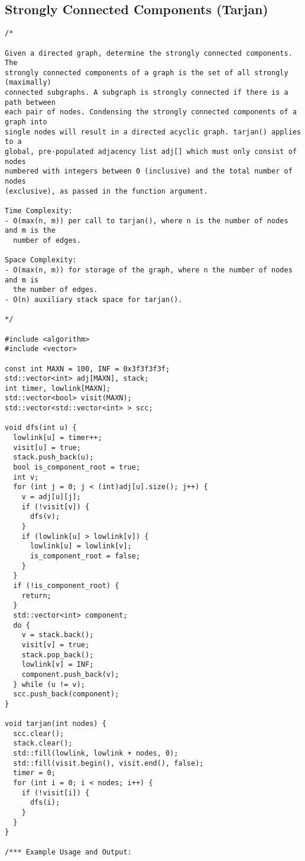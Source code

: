 \subsection{Strongly Connected Components (Tarjan)}
\begin{lstlisting}
/*

Given a directed graph, determine the strongly connected components. The
strongly connected components of a graph is the set of all strongly (maximally)
connected subgraphs. A subgraph is strongly connected if there is a path between
each pair of nodes. Condensing the strongly connected components of a graph into
single nodes will result in a directed acyclic graph. tarjan() applies to a
global, pre-populated adjacency list adj[] which must only consist of nodes
numbered with integers between 0 (inclusive) and the total number of nodes
(exclusive), as passed in the function argument.

Time Complexity:
- O(max(n, m)) per call to tarjan(), where n is the number of nodes and m is the
  number of edges.

Space Complexity:
- O(max(n, m)) for storage of the graph, where n the number of nodes and m is
  the number of edges.
- O(n) auxiliary stack space for tarjan().

*/

#include <algorithm>
#include <vector>

const int MAXN = 100, INF = 0x3f3f3f3f;
std::vector<int> adj[MAXN], stack;
int timer, lowlink[MAXN];
std::vector<bool> visit(MAXN);
std::vector<std::vector<int> > scc;

void dfs(int u) {
  lowlink[u] = timer++;
  visit[u] = true;
  stack.push_back(u);
  bool is_component_root = true;
  int v;
  for (int j = 0; j < (int)adj[u].size(); j++) {
    v = adj[u][j];
    if (!visit[v]) {
      dfs(v);
    }
    if (lowlink[u] > lowlink[v]) {
      lowlink[u] = lowlink[v];
      is_component_root = false;
    }
  }
  if (!is_component_root) {
    return;
  }
  std::vector<int> component;
  do {
    v = stack.back();
    visit[v] = true;
    stack.pop_back();
    lowlink[v] = INF;
    component.push_back(v);
  } while (u != v);
  scc.push_back(component);
}

void tarjan(int nodes) {
  scc.clear();
  stack.clear();
  std::fill(lowlink, lowlink + nodes, 0);
  std::fill(visit.begin(), visit.end(), false);
  timer = 0;
  for (int i = 0; i < nodes; i++) {
    if (!visit[i]) {
      dfs(i);
    }
  }
}

/*** Example Usage and Output:


\end{lstlisting}
